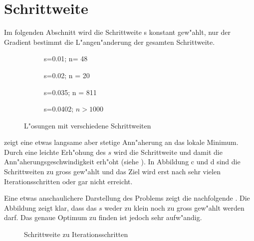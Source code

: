 \section{Schrittweite}
Im folgenden Abschnitt wird die Schrittweite s konstant gew"ahlt, nur
der Gradient bestimmt die L"angen"anderung der gesamten Schrittweite.


\begin{figure}[h]
\centering
\begin{subfigure}[b]{0.49\textwidth}
\centering
\caption{s=0.01; n= 48}\label{schrittweite_a}
\end{subfigure} \begin{subfigure}[b]{0.49\textwidth}
\centering
\caption{s=0.02; n = 20}\label{schrittweite_b}
\end{subfigure}

\begin{subfigure}[b]{0.49\textwidth}
\centering
\caption{s=0.035; n = 811}
\end{subfigure} \begin{subfigure}[b]{0.49\textwidth}
\centering
\caption{s=0.0402; $n > 1000$}
\end{subfigure}
\caption{L"osungen mit verschiedene Schrittweiten}
\label{schrittweite}
\end{figure}

 zeigt eine etwas langsame aber stetige Ann"aherung
an das lokale Minimum. Durch eine leichte Erh"ohung des $s$ wird die
Schrittweite und damit die Ann"aherungsgeschwindigkeit erh"oht (siehe
 ).
In Abbildung c und d sind die Schrittweiten zu gross gew"ahlt und das Ziel
wird erst nach sehr vielen Iterationsschritten oder gar nicht erreicht.

Eine etwas anschaulichere Darstellung des Problems zeigt die nachfolgende
.
Die Abbildung zeigt klar, dass das $s$ weder zu klein noch zu gross gew"ahlt
werden darf. Das genaue Optimum zu finden ist jedoch sehr aufw"andig.

\begin{figure}
\centering
\caption{Schrittweite zu Iterationsschritten}
\label{step}
\end{figure}
